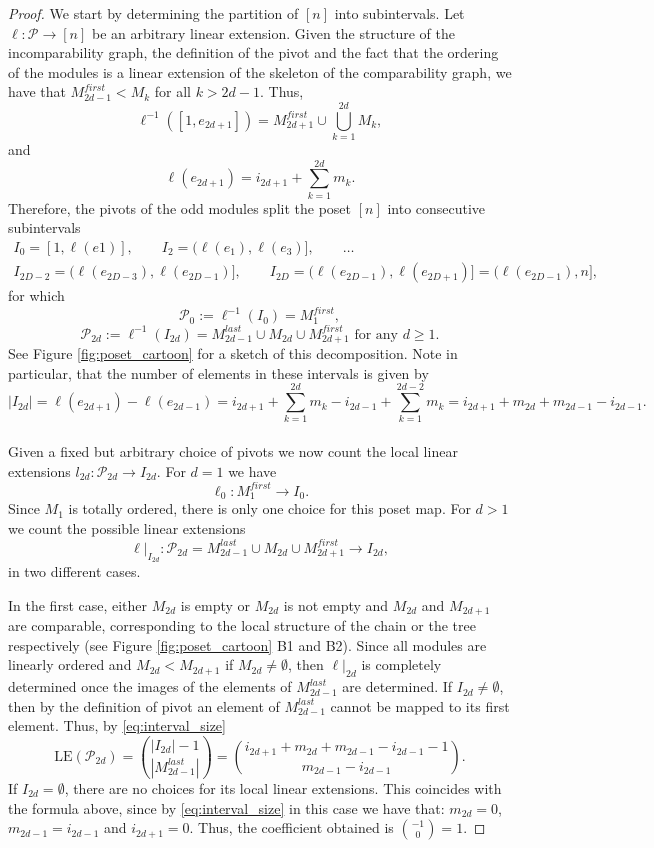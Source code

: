 \documentclass[9pt,a4paper,oneside]{article}
\newcommand{\cP}{\mathcal{P}}
\newcommand{\lex}{\mathrm{LE}}
\begin{document}
\begin{proof}
We start by determining the partition of $[n]$ into subintervals.
Let $\ell:\cP\to [n]$ be an arbitrary linear extension.  Given the structure of the incomparability graph, the definition of the pivot and the fact that the ordering of the modules is a linear extension of the skeleton of the comparability graph, we have that 
$M_{2d-1}^{first} < M_k$ for all $k>2d-1$.  Thus,  
\[\ell^{-1}([1, e_{2d+1}]) = M_{2d+1}^{first} \cup \bigcup_{k=1}^{2d}  M_k, \]
and 
\begin{equation} \label{h:tree}
\ell(e_{2d+1})=i_{2d+1}+\sum_{k=1}^{2d}m_k.
\end{equation}
Therefore,  the pivots of the odd modules split the poset $[n]$ into consecutive subintervals 
\begin{gather*}
I_0=[1 ,\ell(e1)],\quad\quad I_2=(\ell(e_1), \ell(e_3)],  \quad\quad\ldots \\I_{2D-2}=(\ell(e_{2D-3}),\ell(e_{2D-1})],\quad\quad I_{2D}=(\ell(e_{2D-1}),\ell(e_{2D+1})]=(\ell(e_{2D-1}),n],
\end{gather*}
for which 
\[\cP_0:=\ell^{-1}(I_0)=M_{1}^{first}, \]
\[\cP_{2d} :=\ell^{-1}(I_{2d})=M_{2d-1}^{last}\cup M_{2d}\cup M_{2d+1}^{first} \text{ for any } d\geq 1.\]
See Figure \ref{fig:poset_cartoon} for a sketch of this decomposition. 
Note in particular, that the number of elements in these intervals is given by 
\begin{equation}
|I_{2d}| =  \ell(e_{2d+1})-\ell(e_{2d-1}) = i_{2d+1}+\sum_{k=1}^{2d}m_k - i_{2d-1}+\sum_{k=1}^{2d-2}m_k = i_{2d+1}+ m_{2d}+ m_{2d-1} - i_{2d-1}.
\label{eq:interval_size}
\end{equation}\\


Given a fixed but arbitrary choice of pivots we now count the local linear extensions $l_{2d}:\cP_{2d}\to I_{2d}$.  
For $d=1$ we have 
\[\ell_0:M_1^{first} \to I_0.\]
Since $M_1$ is totally ordered,  there is only one choice for this poset map.  
For $d>1$ we count the possible linear extensions 
\[\ell|_{I_{2d}}:\cP_{2d}=M_{2d-1}^{last}\cup M_{2d}\cup M_{2d+1}^{first} \to I_{2d},\]
in two different cases.

In the first case,  either $M_{2d}$ is empty or $M_{2d}$ is not empty and $M_{2d}$ and $M_{2d+1}$ are comparable, corresponding to the local structure of the chain or the tree respectively (see Figure \ref{fig:poset_cartoon} B1 and B2).
Since all modules are linearly ordered and $ M_{2d} < M_{2d+1}$ if $ M_{2d}\neq\emptyset$,  then $\ell|_{2d}$ is completely determined once the images of the elements of $M_{2d-1}^{last}$ are determined. 
If $I_{2d}\neq \emptyset$, then by the definition of pivot an element of $M_{2d-1}^{last}$ cannot be mapped to its first element.
Thus,   by \eqref{eq:interval_size} 
\[\lex(\cP_{2d})
=\binom{|I_{2d}|-1}{|M_{2d-1}^{last}|}
=\binom{i_{2d+1}+m_{2d}+m_{2d-1}-i_{2d-1}-1}{m_{2d-1}-i_{2d-1}}.
\]
If $I_{2d}= \emptyset$,  there are no choices for its local linear extensions.  This coincides with the formula above, since by \eqref{eq:interval_size} in this case we have that: $m_{2d}=0$,  $m_{2d-1}=i_{2d-1}$ and $i_{2d+1}=0$. Thus, the coefficient obtained is $\binom{-1}{0}=1$.


\end{proof}
\end{document}
